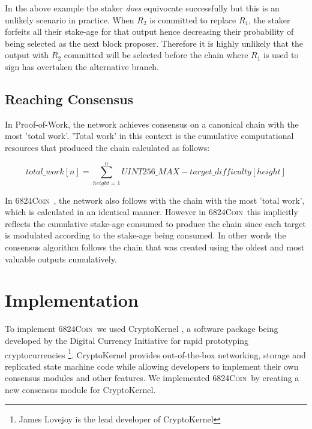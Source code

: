 \documentclass{article}
\newcommand{\coin}{ \textsc{6824Coin}\ }
\begin{document}
\begin{figure}[!h]
	\centering
{}
\end{figure}
 
 In the above example the staker \textit{does} equivocate successfully but this is an unlikely scenario in practice. When $ R_2 $ is committed to replace $ R_1 $, the staker forfeits all their stake-age for that output hence decreasing their probability of being selected as the next block proposer. Therefore it is highly unlikely that the output with $ R_2 $ committed will be selected before the chain where $ R_1 $ is used to sign has overtaken the alternative branch.
 
\subsection{Reaching Consensus}
In Proof-of-Work, the network achieves consensus on a canonical chain with the most 'total work'. 'Total work' in this context is the cumulative computational resources that produced the chain calculated as follows:

$$ total\_work[n] = \sum_{height=1}^{n} UINT256\_MAX - target\_difficulty[height] $$

In \coin, the network also follows with the chain with the most 'total work', which is calculated in an identical manner. However in \coin this implicitly reflects the cumulative stake-age consumed to produce the chain since each target is modulated according to the stake-age being consumed. In other words the consensus algorithm follows the chain that was created using the oldest and most valuable outputs cumulatively.  


\section{Implementation}
To implement \coin we used CryptoKernel \cite{ck}, a software package being developed by the Digital Currency Initiative for rapid prototyping cryptocurrencies \footnote{James Lovejoy is the lead developer of CryptoKernel}. CryptoKernel provides out-of-the-box networking, storage and replicated state machine code while allowing developers to implement their own consensus modules and other features. We implemented \coin by creating a new consensus module for CryptoKernel.
\end{document}
